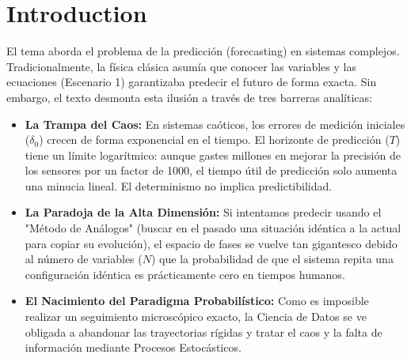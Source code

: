 \documentclass[10pt]{book}
\newcommand{\tbf}{\textbf}
\begin{document}
\newpage
\tableofcontents

\chapter{Introduction}

El tema aborda el problema de la predicción (forecasting) en sistemas complejos. Tradicionalmente, la física clásica asumía que conocer las variables y las ecuaciones (Escenario 1) garantizaba predecir el futuro de forma exacta. Sin embargo, el texto desmonta esta ilusión a través de tres barreras analíticas:  

\begin{itemize}
    \item \tbf{La Trampa del Caos:} En sistemas caóticos, los errores de medición iniciales ($\delta_0$) crecen de forma exponencial en el tiempo. El horizonte de predicción ($T$) tiene un límite logarítmico: aunque gastes millones en mejorar la precisión de los sensores por un factor de 1000, el tiempo útil de predicción solo aumenta una minucia lineal. El determinismo no implica predictibilidad.
    \item \tbf{La Paradoja de la Alta Dimensión:} Si intentamos predecir usando el "Método de Análogos" (buscar en el pasado una situación idéntica a la actual para copiar su evolución), el espacio de fases se vuelve tan gigantesco debido al número de variables ($N$) que la probabilidad de que el sistema repita una configuración idéntica es prácticamente cero en tiempos humanos.
    \item \tbf{El Nacimiento del Paradigma Probabilístico:} Como es imposible realizar un seguimiento microscópico exacto, la Ciencia de Datos se ve obligada a abandonar las trayectorias rígidas y tratar el caos y la falta de información mediante Procesos Estocásticos.
\end{itemize}
\end{document}
